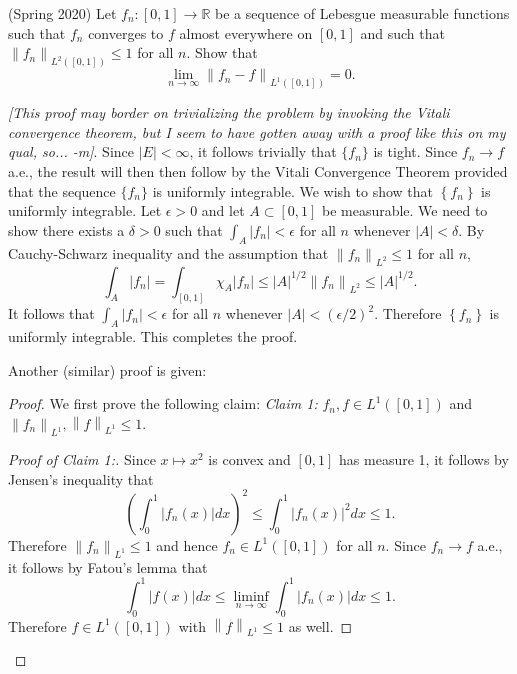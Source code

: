 \documentclass[answers]{exam}
\theoremstyle{problemstyle}
\newcommand{\vt}{\vskip 5mm} %
\newcommand{\norm}[1]{\left\lVert#1\right\rVert} %
\newcommand{\1}[1]{\textbf{1}_{\left[#1\right]}} %
\def\limn{\lim_{n\to\infty}} %
\def\R{\mathbb{R}} %
\begin{document}
\begin{questions}
\question (Spring 2020)
  Let $f_{n}:[0,1]\to \R$ be a sequence of Lebesgue measurable functions such that $f_{n}$ converges to $f$ almost everywhere on $[0,1]$ and such that $\norm{f_{n}}_{L^{2}([0,1])}\leq 1$ for all $n$. Show that
  \begin{equation*}
    \limn \norm{f_{n}-f}_{L^{1}([0,1])}=0.
  \end{equation*}

\begin{solution}
  
  \textit{[This proof may border on trivializing the problem by invoking the Vitali convergence theorem, but I seem to have gotten away with a proof like this on my qual, so... -m]}. Since $|E|<\infty$, it follows trivially that $\{f_{n}\}$ is tight. Since $f_{n}\to f$ a.e., the result will then then follow by the Vitali Convergence Theorem provided that the sequence $\{f_{n}\}$ is uniformly integrable.
  We wish to show that $\left\{ f_{n} \right\}$ is uniformly integrable. Let $\epsilon>0$ and let $A\subset [0,1]$ be measurable. We need to show there exists a $\delta>0$ such that $\int_{A}|f_{n}| <\epsilon$ for all $n$ whenever $|A|<\delta$. By Cauchy-Schwarz inequality and the assumption that $\norm{f_{n}}_{L^{2}}\leq 1$ for all $n$,
  \begin{equation*}
    \int_{A}|f_{n}| = \int_{[0,1]}\chi_{A}|f_{n}| \leq |A|^{1/2}\norm{f_{n}}_{L^{2}} \leq |A|^{1/2}.
  \end{equation*}
  It follows that $\int_{A}|f_{n}|<\epsilon $ for all $n$ whenever $|A|<(\epsilon/2)^{2}$. Therefore $\left\{ f_{n} \right\}$ is uniformly integrable. This completes the proof.


Another (similar) proof is given:
\begin{proof}

  We first prove the following claim:
  \vt
  \noindent
  \textit{Claim 1:} $f_{n},f\in L^{1}([0,1])$ and $\norm{f_{n}}_{L^{1}},\norm{f}_{L^{1}}\leq 1$.
  \begin{proof}[Proof of Claim 1:]
    Since $x\mapsto x^{2}$ is convex and $[0,1]$ has measure 1, it follows by Jensen's inequality that
    \begin{equation*}
      \left(\int_{0}^{1}|f_{n}(x)|dx\right)^{2}\leq \int_{0}^{1}|f_{n}(x)|^{2}dx\leq 1.
    \end{equation*}
    Therefore $\norm{f_{n}}_{L^{1}}\leq 1$ and hence $f_{n}\in L^{1}([0,1])$ for all $n$. Since $f_{n}\to f$ a.e., it follows by Fatou's lemma that
    \begin{equation*}
      \int_{0}^{1}|f(x)|dx \leq \liminf_{n\to\infty}\int_{0}^{1}|f_{n}(x)|dx \leq 1.
    \end{equation*}
    Therefore $f\in L^{1}([0,1])$ with $\norm{f}_{L^{1}}\leq 1$  as well.
  \end{proof}




\end{proof}
\end{solution}
\end{questions}
\end{document}
